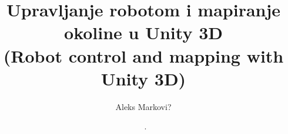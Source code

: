 



%




\frontmatter   %



\title{Upravljanje robotom i mapiranje okoline u Unity 3D
	 \\ (Robot control and mapping with Unity 3D)}   %

\date{\MONTH~\the\year.}   %

\author{Aleks Markovi?}  %
\maketitle		%



\maketitleabstract

\begin{assignmentpage}
\end{assignmentpage}

\begin{honestystatementpage}
	
\end{honestystatementpage}

\begin{acknowledgments} %
	  
\end{acknowledgments}

